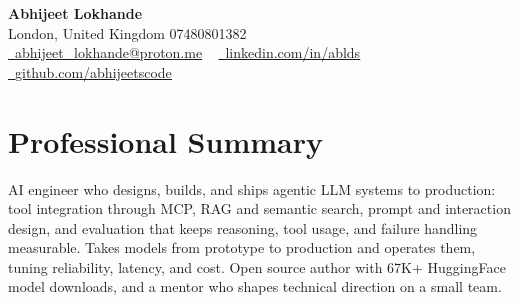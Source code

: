 \documentclass[a4paper,10pt]{article}
\begin{document}
    \begin{center}
        {\Huge\bfseries Abhijeet Lokhande}
        \\[2pt] {\color{muted}London, United Kingdom \textbar{} 07480801382}\\
        \small
        \href{mailto:abhijeet_lokhande@proton.me}{\raisebox{-0.2\height}{\color{primary}\faEnvelope}\  \underline{abhijeet\_lokhande@proton.me}} ~
        \href{https://www.linkedin.com/in/ablds/}{\raisebox{-0.2\height}{\color{primary}\faLinkedin}\ \underline{linkedin.com/in/ablds}}  ~
        \href{https://github.com/abhijeetscode}{\raisebox{-0.2\height}{\color{primary}\faGithub}\ \underline{github.com/abhijeetscode}}
    \end{center}

\section{Professional Summary}
\vspace{-5pt}
{\color{muted}AI engineer who designs, builds, and ships agentic LLM systems to production: tool integration through MCP, RAG and semantic search, prompt and interaction design, and evaluation that keeps reasoning, tool usage, and failure handling measurable. Takes models from prototype to production and operates them, tuning reliability, latency, and cost. Open source author with 67K+ HuggingFace model downloads, and a mentor who shapes technical direction on a small team.}
\vspace{2pt}

\end{document}
